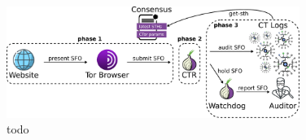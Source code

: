 %
%

%
%


\begin{figure}
    \centering
    \includegraphics[width=0.85\textwidth]{img/design-auditor}
    \caption{todo}
    \label{fig:design-auditor}
\end{figure}

